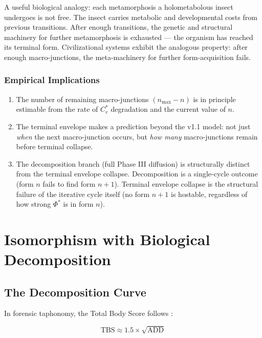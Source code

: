 \documentclass[12pt,a4paper]{article}
\newcommand{\reagmeta}{C_r^{*}}
\newcommand{\Phistar}{\Phi^{*}}
\newcommand{\nmax}{n_{\mathrm{max}}}
\begin{document}
A useful biological analogy: each metamorphosis a holometabolous insect undergoes is not free. The insect carries metabolic and developmental costs from previous transitions. After enough transitions, the genetic and structural machinery for further metamorphosis is exhausted --- the organism has reached its terminal form. Civilizational systems exhibit the analogous property: after enough macro-junctions, the meta-machinery for further form-acquisition fails.

\subsubsection{Empirical Implications}

\begin{enumerate}[label=(\roman*)]
    \item The number of remaining macro-junctions $(\nmax - n)$ is in principle estimable from the rate of $\reagmeta$ degradation and the current value of $n$.
    \item The terminal envelope makes a prediction beyond the v1.1 model: not just \emph{when} the next macro-junction occurs, but \emph{how many} macro-junctions remain before terminal collapse.
    \item The decomposition branch (full Phase III diffusion) is structurally distinct from the terminal envelope collapse. Decomposition is a single-cycle outcome (form $n$ fails to find form $n+1$). Terminal envelope collapse is the structural failure of the iterative cycle itself (no form $n+1$ is hostable, regardless of how strong $\Phistar$ is in form $n$).
\end{enumerate}


\section{Isomorphism with Biological Decomposition}\label{sec:decomposition}

\subsection{The Decomposition Curve}

In forensic taphonomy, the Total Body Score follows \cite{tbs_megyesi}:

\begin{equation}\label{eq:tbs}
\mathrm{TBS} \approx 1.5 \times \sqrt{\mathrm{ADD}}
\end{equation}
\end{document}
